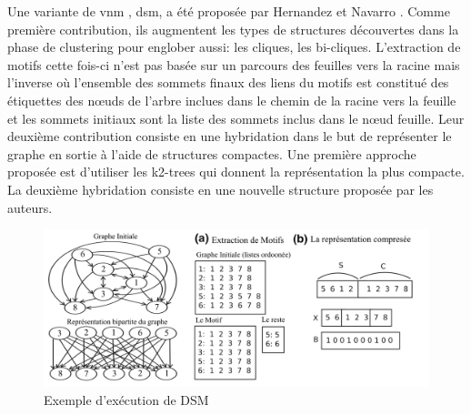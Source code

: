 \newpage	
	Une variante de \gls{vnm} , 
	\gls{dsm}, a été proposée par Hernandez et Navarro \citep{hernandez2014compressed}. Comme première contribution, ils augmentent les types de structures découvertes dans la phase de clustering pour englober aussi: les cliques, les bi-cliques. L'extraction de motifs cette fois-ci n'est pas basée sur un parcours des feuilles vers la racine mais l'inverse où  l'ensemble des sommets finaux des liens du motifs est constitué des étiquettes des nœuds de l'arbre inclues dans le chemin de la racine vers la feuille et  les sommets initiaux sont la liste des sommets inclus dans le nœud feuille. 
				Leur deuxième contribution consiste en une hybridation dans le but de représenter le graphe en sortie à l'aide de structures compactes. Une première approche proposée est d'utiliser les  k2-trees \citep{brisaboa2009k}  qui donnent la représentation la plus compacte.  
				La deuxième hybridation consiste en une nouvelle structure proposée par les auteurs.\\
				
				
				
				\begin{figure}[!h]
					\includegraphics[scale=0.23]{ressources/image/VNM2_exemple.png} 
					\caption{Exemple d'exécution de DSM}
					\label{SDM}
				\end{figure}
			